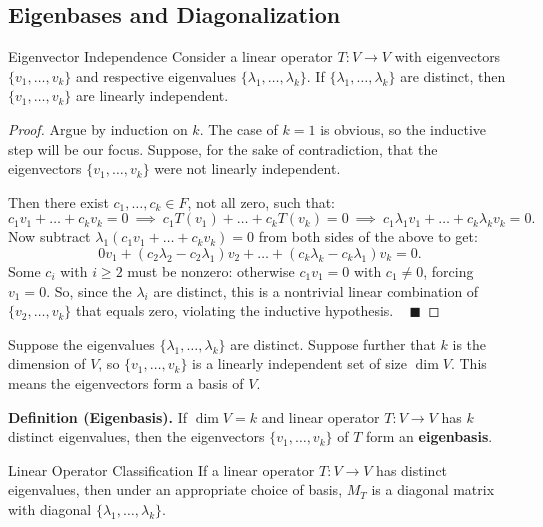 \subsection{Eigenbases and Diagonalization}

\begin{theorem}{Eigenvector Independence}
    Consider a linear operator $T: V \to V$ with eigenvectors $\{v_1, \dots, v_k\}$ and respective eigenvalues $\{\lambda_1, \dots, \lambda_k\}$.  If $\{\lambda_1, \dots, \lambda_k\}$ are distinct, then $\{v_1, \dots, v_k\}$ are linearly independent.
\end{theorem}

\begin{proof}
    Argue by induction on $k$.  The case of $k = 1$ is obvious, so the inductive step will be our focus.  Suppose, for the sake of contradiction, that the eigenvectors $\{v_1, \dots, v_k\}$ were not linearly independent.
    
    Then there exist $c_1, \dots, c_k \in F$, not all zero, such that:
    \[ c_1 v_1 + \dots + c_k v_k = 0 ~ \implies ~ c_1T(v_1) + \dots + c_kT(v_k) = 0 ~ \implies ~ c_1\lambda_1v_1 + \dots + c_k\lambda_k v_k = 0. \]
    Now subtract $\lambda_1(c_1v_1 + \dots + c_kv_k) = 0$ from both sides of the above to get:
    \[ 0v_1 + (c_2\lambda_2 - c_2\lambda_1)v_2 + \dots + (c_k\lambda_k - c_k \lambda_1)v_k = 0. \]
    Some $c_i$ with $i \geq 2$ must be nonzero: otherwise $c_1v_1 = 0$ with $c_1 \neq 0$, forcing $v_1 = 0$.  So, since the $\lambda_i$ are distinct, this is a nontrivial linear combination of $\{v_2, \dots, v_k\}$ that equals zero, violating the inductive hypothesis. ~ $\blacksquare$
\end{proof}

Suppose the eigenvalues $\{\lambda_1, \dots, \lambda_k\}$ are distinct.  Suppose further that $k$ is the dimension of $V$, so $\{v_1, \dots, v_k\}$ is a linearly independent set of size $\dim V$.  This means the eigenvectors form a basis of $V$.

\textbf{Definition (Eigenbasis).} If $\dim V = k$ and linear operator $T: V \to V$ has $k$ distinct eigenvalues, then the eigenvectors $\{v_1, \dots, v_k\}$ of $T$ form an \textbf{eigenbasis}.

\begin{theorem}{Linear Operator Classification}
    If a linear operator $T: V \to V$ has distinct eigenvalues, then under an appropriate choice of basis, $M_T$ is a diagonal matrix with diagonal $\{\lambda_1, \dots, \lambda_k\}$.
\end{theorem}

